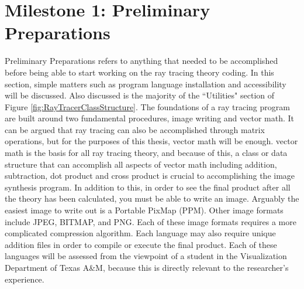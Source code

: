 \section{Milestone 1: Preliminary Preparations}
Preliminary Preparations refers to anything that needed to be accomplished before being able to start working on the ray tracing theory coding.  In this section, simple matters such as program language installation and accessibility will be discussed.  Also discussed is the majority of the ``Utilities" section of Figure \ref{fig:RayTracerClassStructure}. The foundations of a ray tracing program are built around two fundamental procedures, image writing and vector math. It can be argued that ray tracing can also be accomplished through matrix operations, but for the purposes of this thesis, vector math will be enough.  vector math is the basis for all ray tracing theory, and because of this, a class or data structure that can accomplish all aspects of vector math including addition, subtraction, dot product and cross product is crucial to accomplishing the image synthesis program.  In addition to this, in order to see the final product after all the theory has been calculated, you must be able to write an image.  Arguably the easiest image to write out is a Portable PixMap (PPM).  Other image formats include JPEG, BITMAP, and PNG.  Each of these image formats requires a more complicated compression algorithm.  Each language may also require unique addition files in order to compile or execute the final product.  Each of these languages will be assessed from the viewpoint of a student in the Visualization Department of Texas A\&M, because this is directly relevant to the researcher's experience.
